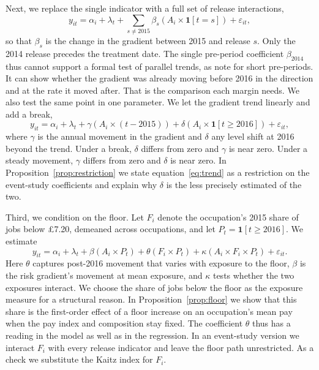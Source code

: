 \documentclass[12pt,leqno]{article}
\begin{document}
Next, we replace the single indicator with a full set of release interactions,
\begin{equation}\label{eq:es}
y_{it} = \alpha_i + \lambda_t + \sum_{s \neq 2015} \beta_s \left( A_i \times \mathbf{1}[t = s] \right) + \varepsilon_{it},
\end{equation}
so that $\beta_s$ is the change in the gradient between 2015 and release $s$. Only the 2014 release precedes the treatment date. The single pre-period coefficient $\beta_{2014}$ thus cannot support a formal test of parallel trends, as \citet{roth2023trending} note for short pre-periods. It can show whether the gradient was already moving before 2016 in the direction and at the rate it moved after. That is the comparison each margin needs. We also test the same point in one parameter. We let the gradient trend linearly and add a break,
\begin{equation}\label{eq:trend}
y_{it} = \alpha_i + \lambda_t + \gamma \left( A_i \times (t - 2015) \right) + \delta \left( A_i \times \mathbf{1}[t \geq 2016] \right) + \varepsilon_{it},
\end{equation}
where $\gamma$ is the annual movement in the gradient and $\delta$ any level shift at 2016 beyond the trend. Under a break, $\delta$ differs from zero and $\gamma$ is near zero. Under a steady movement, $\gamma$ differs from zero and $\delta$ is near zero. In Proposition~\ref{prop:restriction} we state equation~\eqref{eq:trend} as a restriction on the event-study coefficients and explain why $\delta$ is the less precisely estimated of the two.

Third, we condition on the floor. Let $F_i$ denote the occupation's 2015 share of jobs below \pounds 7.20, demeaned across occupations, and let $P_t = \mathbf{1}[t \geq 2016]$. We estimate
\begin{equation}\label{eq:nlw}
y_{it} = \alpha_i + \lambda_t + \beta \left( A_i \times P_t \right) + \theta \left( F_i \times P_t \right) + \kappa \left( A_i \times F_i \times P_t \right) + \varepsilon_{it}.
\end{equation}
Here $\theta$ captures post-2016 movement that varies with exposure to the floor, $\beta$ is the risk gradient's movement at mean exposure, and $\kappa$ tests whether the two exposures interact. We choose the share of jobs below the floor as the exposure measure for a structural reason. In Proposition~\ref{prop:floor} we show that this share is the first-order effect of a floor increase on an occupation's mean pay when the pay index and composition stay fixed. The coefficient $\theta$ thus has a reading in the model as well as in the regression. In an event-study version we interact $F_i$ with every release indicator and leave the floor path unrestricted. As a check we substitute the Kaitz index for $F_i$.
\end{document}
